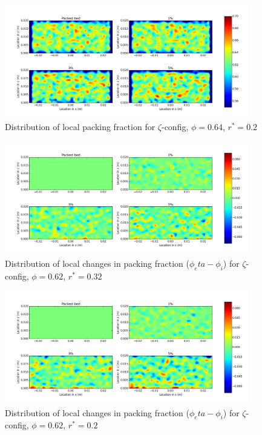 \begin{figure}[!t]
    \centering
    \includegraphics[width = 0.95\textwidth]{figures/z-62-r125-1.png}
    \caption{Distribution of local packing fraction for $\zeta$-config, $\phi = 0.64$, $r^* = 0.2$}\label{fig:z-624r125}
\end{figure}



\begin{figure}[!t]
    \centering
    \includegraphics[width = 0.95\textwidth]{figures/z-62-r23-1-deltas.png}
    \caption{Distribution of local changes in packing fraction ($\phi_eta - \phi_i$) for $\zeta$-config, $\phi = 0.62$, $r^* = 0.32$}\label{fig:z-62-r23-deltas}
\end{figure}

\begin{figure}[!t]
    \centering
    \includegraphics[width = 0.95\textwidth]{figures/z-62-r125-1-deltas.png}
    \caption{Distribution of local changes in packing fraction ($\phi_eta - \phi_i$) for $\zeta$-config, $\phi = 0.62$, $r^* = 0.2$}\label{fig:z-62-r125-deltas}
\end{figure}

